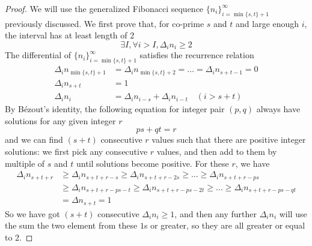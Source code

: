 \documentclass[]{article}
\begin{document}
\begin{proof}
	
	We will use the generalized Fibonacci sequence $\{n_i\}_{i=\min\{s,t\}+1}^{\infty}$ previously discussed. We first prove that, for co-prime $s$ and $t$ and large enough $i$, the interval has at least length of 2
	\[
	\exists I, \forall i>I, \Delta_i n_{i} \ge 2
	\]
	The differential of $\{n_i\}_{i=\min\{s,t\}+1}^{\infty}$ satisfies the recurrence relation
	\begin{align*}
	\Delta_i n_{\min\{s,t\}+1} &= \Delta_i n_{\min\{s,t\}+2} = \dots = \Delta_i n_{s+t-1} = 0\\
	\Delta_i n_{s+t} &= 1\\
	\Delta_i n_i &= \Delta_i n_{i-s} + \Delta_i n_{i-t} \quad (i > s + t)
	\end{align*}
	By Bézout's identity, the following equation for integer pair $(p, q)$ always have solutions for any given integer $r$
	\[
	ps + qt = r
	\]
	and we can find $(s + t)$ consecutive $r$ values such that there are positive integer solutions: we first pick any consecutive $r$ values, and then add to them by multiple of $s$ and $t$ until solutions become positive. For these $r$, we have
	\begin{align*}
	\Delta_i n_{s+t+r} &\geq \Delta_i n_{s+t+r - s} \geq \Delta_i n_{s+t+r - 2s} \geq\dots \geq \Delta_i  n_{s+t+r - ps} \\
		&\geq \Delta_i n_{s+t+r - ps - t} \geq \Delta_i n_{s+t+r - ps - 2t} \geq\dots \geq \Delta_i  n_{s+t+r - ps - qt} \\ 
		&= \Delta n_{s+t} = 1
	\end{align*}
	So we have got $(s + t)$ consecutive $\Delta_i n_i\geq 1$, and then any further $\Delta_i n_i$ will use the sum the two element from these $1$s or greater, so they are all greater or equal to 2.
	

\end{proof}
\end{document}
